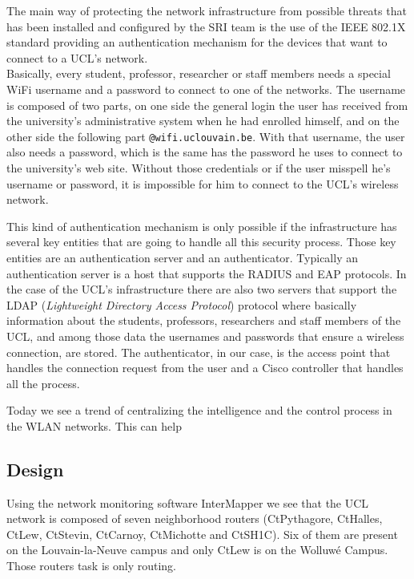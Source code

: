 The main way of protecting the network infrastructure from possible threats that has been installed and configured by the SRI team is the use of the IEEE 802.1X standard providing an authentication mechanism for the devices that want to connect to a UCL's network.\\
Basically, every student, professor, researcher or staff members needs a special WiFi username and a password to connect to one of the networks. The username is composed of two parts, on one side the general login the user has received from the university's administrative system when he had enrolled himself, and on the other side the following part \texttt{@wifi.uclouvain.be}. With that username, the user also needs a password, which is the same has the password he uses to connect to the university's web site. Without those credentials or if the user misspell he's username or password, it is impossible for him to connect to the UCL's wireless network.

This kind of authentication mechanism is only possible if the infrastructure has several key entities that are going to handle all this security process. Those key entities are an authentication server and an authenticator. Typically an authentication server is a host that supports the RADIUS and  EAP protocols. In the case of the UCL's infrastructure there are also two servers that support the LDAP (\textit{Lightweight Directory Access Protocol}) protocol where basically information about the students, professors, researchers and staff members of the UCL, and among those data the usernames and passwords that ensure a wireless connection, are stored. The authenticator, in our case, is the access point that handles the connection request from the user and a Cisco controller that handles all the process. 

Today we see a trend of centralizing the intelligence and the control process in the WLAN networks. This can help 



\subsection{Design}
Using the network monitoring software InterMapper\cite{intermapper} we see that the UCL network is composed of seven neighborhood routers (CtPythagore, CtHalles, CtLew, CtStevin, CtCarnoy, CtMichotte and CtSH1C). Six of them are present on the Louvain-la-Neuve campus and only CtLew is on the Wolluwé Campus. Those routers task is only routing.\\

